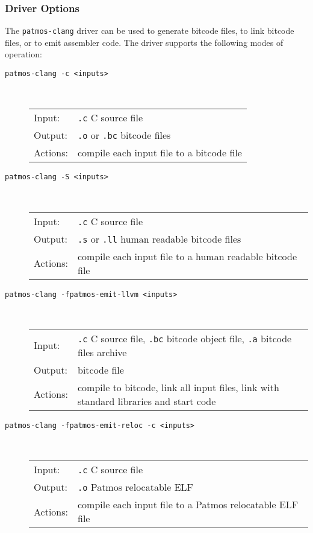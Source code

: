 \subsubsection{Driver Options}

The \texttt{patmos-clang} driver can be used to generate bitcode files, to link bitcode files, or to 
emit assembler code. The driver supports the following modes of operation:

\begin{description}
\item[\texttt{patmos-clang -c <inputs>}] \hfill\\
  \begin{tabular}{ll}
  Input:   & \texttt{.c} C source file \\
  Output:  & \texttt{.o} or \texttt{.bc} bitcode files \\
  Actions: & compile each input file to a bitcode file
  \end{tabular}

\item[\texttt{patmos-clang -S <inputs>}] \hfill\\
  \begin{tabular}{ll}
  Input:   & \texttt{.c} C source file \\
  Output:  & \texttt{.s} or \texttt{.ll} human readable bitcode files \\
  Actions: & compile each input file to a human readable bitcode file
  \end{tabular}

\item[\texttt{patmos-clang -fpatmos-emit-llvm <inputs>}] \hfill\\
  \begin{tabular}{ll}
  Input:   & \texttt{.c} C source file, \texttt{.bc} bitcode object file, \texttt{.a} bitcode files archive \\
  Output:  & bitcode file \\
  Actions: & compile to bitcode, link all input files, link with standard libraries and start code \\
\end{tabular}

\item[\texttt{patmos-clang -fpatmos-emit-reloc -c <inputs>}] \hfill\\
  \begin{tabular}{ll}
  Input:   & \texttt{.c} C source file \\
  Output:  & \texttt{.o} Patmos relocatable ELF \\
  Actions: & compile each input file to a Patmos relocatable ELF file
  \end{tabular}


\end{description}
